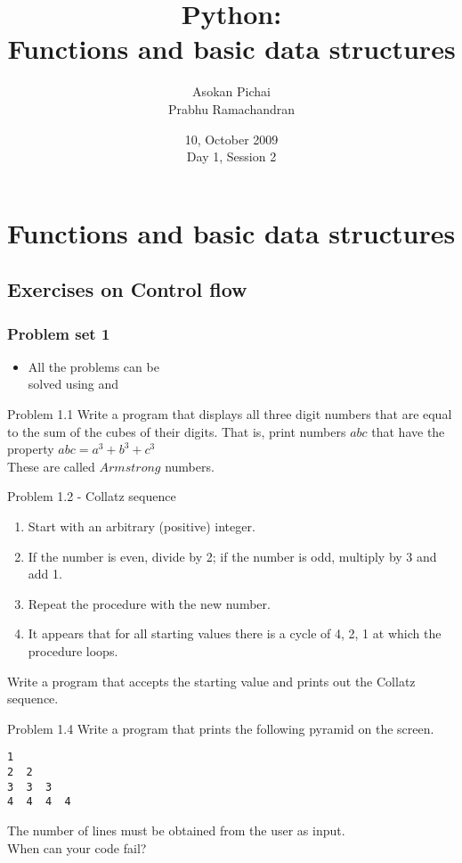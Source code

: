 \documentclass[14pt,compress]{beamer}
\title[Basic Python]{Python:\\Functions and basic data structures}
\author[FOSSEE Team] {Asokan Pichai\\Prabhu Ramachandran}
\institute[IIT Bombay] {Department of Aerospace Engineering\\IIT Bombay}
\date[] {10, October 2009\\Day 1, Session 2}
\newcounter{time}
\newcommand{\inctime}[1]{\addtocounter{time}{#1}{\tiny \thetime\ m}}
\newcommand{\kwrd}[1]{ \texttt{\textbf{\color{blue}{#1}}}  }
\begin{document}
\begin{frame}
  \titlepage
\end{frame}

\section{Functions and basic data structures}

\subsection{Exercises on Control flow}
\begin{frame}
  \frametitle{Problem set 1}
  \begin{itemize}
    \item All the problems can be\\
      solved using \kwrd{if} and \kwrd{while} 
  \end{itemize}
\end{frame}

\begin{frame}{Problem 1.1}
  Write a program that displays all three digit numbers that are equal to the sum of the cubes of their digits. That is, print numbers $abc$ that have the property $abc = a^3 + b^3 + c^3$\\
These are called $Armstrong$ numbers.
\end{frame}
  
\begin{frame}{Problem 1.2 - Collatz sequence}
\begin{enumerate}
  \item Start with an arbitrary (positive) integer. 
  \item If the number is even, divide by 2; if the number is odd, multiply by 3 and add 1.
  \item Repeat the procedure with the new number.
  \item It appears that for all starting values there is a cycle of 4, 2, 1 at which the procedure loops.
\end{enumerate}
    Write a program that accepts the starting value and prints out the Collatz sequence.

\end{frame}

\begin{frame}[fragile]{Problem 1.4}
  Write a program that prints the following pyramid on the screen. 
  \begin{lstlisting}
1
2  2
3  3  3
4  4  4  4
  \end{lstlisting}
The number of lines must be obtained from the user as input.\\
\pause
When can your code fail?
\only<2->{\inctime{20}}
\end{frame}
\end{document}
